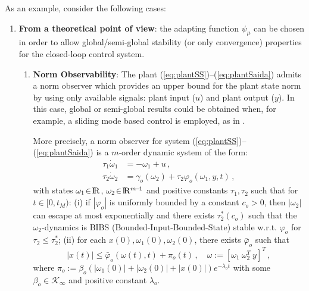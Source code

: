 \documentclass[letterpaper, 10 pt, conference]{ieeeconf}  %
\def\re{{\rm I}\! {\rm R}}
\theoremstyle{plain}
\theoremstyle{definition}
\theoremstyle{remark}
\begin{document}
As an example, consider the following cases:
%
\begin{enumerate}

\item {\bf From a theoretical point of view}: the adapting function $\psi_\mu$ can be chosen in order to allow global/semi-global stability (or only convergence) properties for the closed-loop control system. 

\begin{enumerate}

\item {\bf Norm Observability}: The plant
(\ref{eq:plantSS})--(\ref{eq:plantSaida}) admits a norm observer which provides an upper bound for the plant state norm by using only  available signals: plant input ($u$) and plant output ($y$). In this case, global or semi-global results could be obtained when, for example, a sliding mode based control is employed, as in \cite{POH:2011}.  


More precisely, a norm observer for system
(\ref{eq:plantSS})--(\ref{eq:plantSaida})  is a $m$-order
dynamic system of the form:
%
\begin{align}
\tau_1 \dot{\omega}_1 &= -\omega_1+u\,, \label{eq:defuav} \\
\tau_2 \dot{\omega}_2 &=
\gamma_o(\omega_2)+\tau_2\varphi_o(\omega_1,y,t)\,,\label{eq:normobsgeneric}
\end{align}
%
with states $\omega_1\!\in\!\re$, $\omega_2\!\in\!\re^{m\!-\!1}$ and
positive constants $\tau_1, \tau_2$ such that for $t\in[0,t_M)$: (i)
if $|\varphi_o|$ is uniformly bounded by a constant $c_o\!>\!0$,
then $|\omega_2|$ can escape at most exponentially and there exists
$\tau_2^*(c_o)$ such that the $\omega_2$-dynamics is BIBS
(Bounded-Input-Bounded-State) stable w.r.t. $\varphi_o$ for
$\tau_2\leq \tau_2^*$; (ii)
for each $x(0),\omega_1(0),\omega_2(0)$, there exists $\bar{\varphi}_o$ such that
%
\begin{equation}
|x(t)| \leq \bar{\varphi}_o(\omega(t),t) + \pi_o(t) \,, \quad
\omega:=[\omega_1 \ \omega_2^T \ y]^T\,,\label{eq:xboundfromw}
\end{equation}
%
where
$\pi_o:=\beta_o(|\omega_1(0)|\!+\!|\omega_2(0)|\!+\!|x(0)|)e^{-\lambda_o
t}$ with some $\beta_o \in \mathcal{K}_\infty$ and positive
constant $\lambda_o$.




\end{enumerate}
\end{enumerate}
\end{document}
